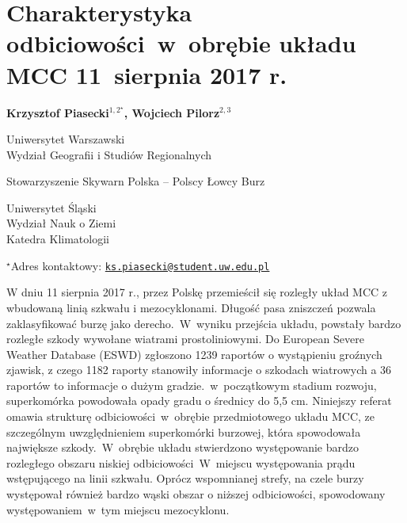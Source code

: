 \documentclass[\main/boa.tex]{subfiles}
\begin{document}
\sloppy


\section{Charakterystyka odbiciowości~w~obrębie układu MCC 11~sierpnia 2017 r.}

\begin{center}
  {\bf {} Krzysztof Piasecki$^{1,2^\star}$,  Wojciech Pilorz$^{2,3}$}
\end{center}

\vskip 0.3cm

\begin{affiliations}
\begin{enumerate}
\begin{minipage}{0.915\textwidth}
\centering
\item Uniwersytet Warszawski \\ Wydział Geografii i Studiów Regionalnych
\item Stowarzyszenie Skywarn Polska – Polscy Łowcy Burz\\[-2pt]
\item Uniwersytet Śląski\\Wydział Nauk o Ziemi\\ Katedra Klimatologii\\[-2pt]
\end{minipage}
\end{enumerate}
$^\star$Adres kontaktowy: \href{mailto:ks.piasecki@student.uw.edu.pl}{\nolinkurl{ks.piasecki@student.uw.edu.pl}}\\
\end{affiliations}

\vskip 0.5cm


\vskip 0.5cm

W dniu 11 sierpnia 2017 r., przez Polskę przemieścił się rozległy układ MCC z wbudowaną linią szkwału i mezocyklonami. Długość pasa zniszczeń pozwala zaklasyfikować burzę jako derecho.~W~wyniku przejścia układu, powstały bardzo rozległe szkody wywołane wiatrami prostoliniowymi. Do European Severe Weather Database (ESWD) zgłoszono 1239 raportów o wystąpieniu groźnych zjawisk, z czego 1182 raporty stanowiły informacje o szkodach wiatrowych a 36 raportów to informacje o dużym gradzie.~w~początkowym stadium rozwoju, superkomórka powodowała opady gradu o średnicy do 5,5 cm. Niniejszy referat omawia strukturę odbiciowości~w~obrębie przedmiotowego układu MCC, ze szczególnym uwzględnieniem superkomórki burzowej, która spowodowała największe szkody.~W~obrębie układu stwierdzono występowanie bardzo rozległego obszaru niskiej odbiciowości~W~miejscu występowania prądu wstępującego na linii szkwału. Oprócz wspomnianej strefy, na czele burzy występował również bardzo wąski obszar o niższej odbiciowości, spowodowany występowaniem~w~tym miejscu mezocyklonu.
\end{document}
